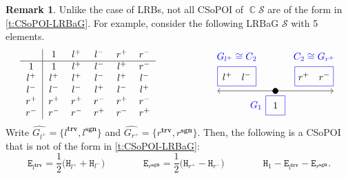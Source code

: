 \documentclass[11pt, oneside, reqno]{amsart}
\theoremstyle{definition}
\newtheorem{remark}[theorem]{Remark}
\numberwithin{equation}{section}
\DeclareMathOperator{\C}{\mathbb{C}}
\def \SS{{\mathcal{S}}}
\def \kk{\C}
\def \wh{\widehat}
\def \ztwo {{C_2}}
\def \sgn{\mathbf{sgn}}
\def \trv{\mathbf{trv}}
\newcommand{\B}[1]{\mathtt{#1}} 			%
\begin{document}
\begin{remark} 
Unlike the case of LRBs, not all CSoPOI of $\kk \SS$ are of the form in \cref{t:CSoPOI-LRBaG}. For example, consider the following LRBaG $\SS$ with 5 elements.
\[
    \begin{gathered}
        \begin{tabular}{c|ccccc}
              & $1$    & $l^+$ & $l^-$ & $r^+$ & $r^-$ \\
        \hline                                                                                 
        $1$   & $1$    & $l^+$ & $l^-$ & $l^+$ & $r^-$ \\
        $l^+$ & $l^+$  & $l^+$ & $l^-$ & $l^+$ & $l^-$ \\
        $l^-$ & $l^-$  & $l^-$ & $l^+$ & $l^-$ & $l^+$ \\
        $r^+$ & $r^+$  & $r^+$ & $r^-$ & $r^+$ & $r^-$ \\
        $r^-$ & $r^-$  & $r^-$ & $r^+$ & $r^-$ & $r^+$ 
        \end{tabular}
    \end{gathered}
    \qquad\qquad\qquad
    \begin{gathered}
        \begin{tikzpicture}
            \draw[<->] (-60bp,0) -- (60bp,0);
            \draw [fill=black] (0,0) circle (.1);
            
            \node [] at (  0bp, -15bp) {$1$};
            \node [] at (-40bp,  15bp) {$l^+ \quad l^-$};
            \node [] at ( 40bp,  15bp) {$r^+ \quad r^-$};
    
            \draw [blue] (-60bp,  5bp) rectangle (-20bp, 25bp); \node [blue] at (-40bp,  35bp) {$G_{l^+} \cong \ztwo$};
            \draw [blue] ( 60bp,  5bp) rectangle ( 20bp, 25bp); \node [blue] at ( 40bp,  35bp) {$\ztwo \cong G_{r^+}$};
            \draw [blue] (-10bp, -5bp) rectangle ( 10bp,-25bp); \node [blue] at (-20bp, -15bp) {$G_{1}$};
        \end{tikzpicture}
    \end{gathered}
\]
Write $\wh{G_{l^+}} = \{ l^{\trv} , l^{\sgn} \}$ and $\wh{G_{r^+}} = \{ r^{\trv} , r^{\sgn} \}$.
Then, the following is a CSoPOI that is not of the form in \cref{t:CSoPOI-LRBaG}:
\[
    \B{E}_{l^{\trv}} = \dfrac{1}{2} \big( \B{H}_{l^+} + \B{H}_{l^-} \big)
    \qquad\qquad
    \B{E}_{r^{\sgn}} = \dfrac{1}{2} \big( \B{H}_{r^+} - \B{H}_{r^-} \big)
    \qquad\qquad
    \B{H}_1 - \B{E}_{l^{\trv}} - \B{E}_{r^{\sgn}}.
\]
\end{remark}
\end{document}
